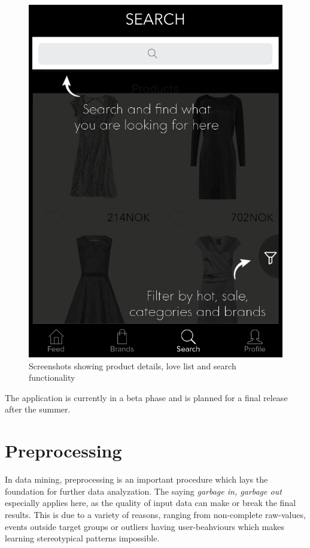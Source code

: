 \begin{figure}[H]
\begin{minipage}{.3\linewidth}
        \includegraphics[height=1.5\linewidth]{image/SoBazaarsearch.png}
    \end{minipage}
    \caption{Screenshots showing product details, love list and search
    functionality}
    \label{figure:SoBazaarfeed}
\end{figure}

The application is currently in a beta phase and is planned for a final release after the summer.

\section{Preprocessing}
\label{sec:preprocessing}

In data mining, preprocessing is an important procedure which lays the
foundation for further data analyzation. The saying \emph{garbage in, garbage
out}~\cite{GIGO} especially applies here, as the quality of input data can make or
break the final results. This is due to a variety of reasons, ranging from
non-complete raw-values, events outside target groups or outliers having
user-beahviours which makes learning stereotypical patterns impossible.

